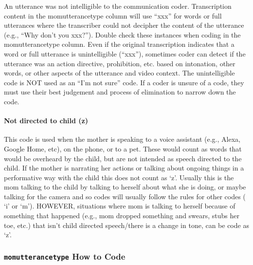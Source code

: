 \documentclass[
]{book}
\begin{document}
An utterance was not intelligible to the communication coder.
Transcription content in the momutterancetype column will use ``xxx'' for words or full utterances where the transcriber could not decipher the content of the utterance (e.g., ``Why don't you xxx?''). Double check these instances when coding in the momutterancetype column. Even if the original transcription indicates that a word or full utterance is unintelligible (``xxx''), sometimes coder can detect if the utterance was an action directive, prohibition, etc. based on intonation, other words, or other aspects of the utterance and video context.
The unintelligible code is NOT used as an ``I'm not sure'' code. If a coder is unsure of a code, they must use their best judgement and process of elimination to narrow down the code.

\hypertarget{not_directed_to_child}{%
\paragraph*{Not directed to child (z)}\label{not_directed_to_child}}

This code is used when the mother is speaking to a voice assistant (e.g., Alexa, Google Home, etc), on the phone, or to a pet. These would count as words that would be overheard by the child, but are not intended as speech directed to the child.
If the mother is narrating her actions or talking about ongoing things in a performative way with the child this does not count as `z'. Usually this is the mom talking to the child by talking to herself about what she is doing, or maybe talking for the camera and so codes will usually follow the rules for other codes ( `i' or `m').
HOWEVER, situations where mom is talking to herself because of something that happened (e.g., mom dropped something and swears, stubs her toe, etc.) that isn't child directed speech/there is a change in tone, can be code as `z'.

\hypertarget{momutterancetype-how-to-code}{%
\subsubsection{\texorpdfstring{\texttt{momutterancetype} How to Code}{momutterancetype How to Code}}\label{momutterancetype-how-to-code}}
\end{document}
